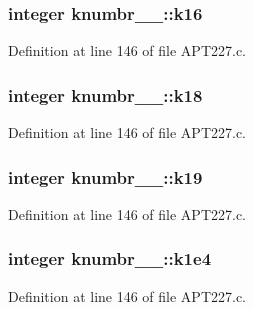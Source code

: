 \subsubsection[{\texorpdfstring{k16}{k16}}]{\setlength{\rightskip}{0pt plus 5cm}integer knumbr\+\_\+\_\+\+::k16}\hypertarget{structknumbr__1___a3f9792bf82854766ea54fe4e3e468735}{}\label{structknumbr__1___a3f9792bf82854766ea54fe4e3e468735}


Definition at line 146 of file A\+P\+T227.\+c.

\subsubsection[{\texorpdfstring{k18}{k18}}]{\setlength{\rightskip}{0pt plus 5cm}integer knumbr\+\_\+\_\+\+::k18}\hypertarget{structknumbr__1___a499adaec260345830c650794e59f66eb}{}\label{structknumbr__1___a499adaec260345830c650794e59f66eb}


Definition at line 146 of file A\+P\+T227.\+c.

\subsubsection[{\texorpdfstring{k19}{k19}}]{\setlength{\rightskip}{0pt plus 5cm}integer knumbr\+\_\+\_\+\+::k19}\hypertarget{structknumbr__1___a149bd9f3eaa55da3733827d4525e2c8c}{}\label{structknumbr__1___a149bd9f3eaa55da3733827d4525e2c8c}


Definition at line 146 of file A\+P\+T227.\+c.

\subsubsection[{\texorpdfstring{k1e4}{k1e4}}]{\setlength{\rightskip}{0pt plus 5cm}integer knumbr\+\_\+\_\+\+::k1e4}\hypertarget{structknumbr__1___aa88c4ddb1e91c2235ed7414088a0b50d}{}\label{structknumbr__1___aa88c4ddb1e91c2235ed7414088a0b50d}


Definition at line 146 of file A\+P\+T227.\+c.

